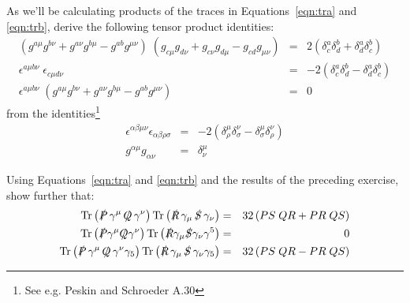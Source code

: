 \documentclass[12pt]{article}
\DeclareMathOperator{\Tr}{Tr}
\newcommand{\Ps} {\ensuremath{\slashed{P}}}
\newcommand{\Qs} {\ensuremath{\slashed{Q}}}
\newcommand{\Rs} {\ensuremath{\slashed{R}}}
\newcommand{\Ss} {\ensuremath{\slashed{S}}}
\begin{document}
\begin{Exercise}
As we'll be calculating products of the traces in Equations~\ref{eqn:tra} and \ref{eqn:trb}, derive the following tensor product identities:
\begin{eqnarray*}
\left(g^{a\mu}g^{b\nu}+g^{a\nu}g^{b\mu}-g^{a b}g^{\mu\nu}\right) \; \left(g_{c\mu}g_{d\nu}+g_{c\nu}g_{d\mu}-g_{c d}g_{\mu\nu}\right) 
&=& 2 \left(\delta^a_c \delta^b_d + \delta^a_d \delta^b_c \right) \\
\epsilon^{a \mu b \nu} \; \epsilon_{c \mu d \nu} &=& -2 \left(\delta^a_c \delta^b_d  - \delta^a_d \delta^b_c \right) \\
\epsilon^{a \mu b \nu} \; \left(g^{a\mu}g^{b\nu}+g^{a\nu}g^{b\mu}-g^{a b}g^{\mu\nu}\right) &=& 0 
\end{eqnarray*}
from the identities\footnote{See e.g. Peskin and Schroeder A.30}
\begin{eqnarray*}
\epsilon^{\alpha\beta\mu\nu}\epsilon_{\alpha\beta\rho\sigma} &=& -2 \left( \delta^\mu_\rho \delta^\nu_\sigma-\delta^\mu_\sigma \delta^\nu_\rho \right) \\
g^{\alpha\mu}g_{\alpha\nu} &=& \delta^\mu_\nu
\end{eqnarray*}
\end{Exercise}


\begin{Exercise}
Using Equations~\ref{eqn:tra} and \ref{eqn:trb} and the results of the preceding exercise, show further that:
\begin{eqnarray}
\Tr\left( \Ps \, \gamma^\mu \, \Qs \, \gamma^\nu \right) \Tr\left( \Rs \, \gamma_\mu \, \Ss \, \gamma_\nu \right)
&=& 32 \left( PS\;QR + PR \; QS \right) \label{eqn:traa} \\
\Tr\left(\Ps\gamma^\mu\Qs\gamma^\nu\right) \Tr\left(\Rs\gamma_\mu\Ss\gamma_\nu\gamma^5\right) &=& 0 \label{eqn:trab}\\
\Tr\left( \Ps \, \gamma^\mu \, \Qs \, \gamma^\nu \gamma_5\right) \Tr\left( \Rs \, \gamma_\mu \, \Ss \, \gamma_\nu \gamma_5 \right) &=& 
32 \left( PS\;QR - PR \; QS \right) \label{eqn:trbb}
\end{eqnarray}
\end{Exercise}
\end{document}
